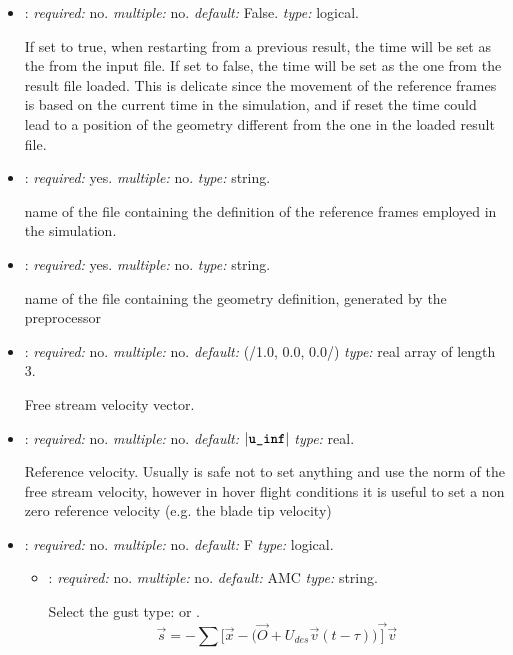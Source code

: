 \begin{itemize}
\item {}: \textit{required:} no. \textit{multiple:} no. \textit{default:} 
False. \textit{type:} logical.

If set to true, when restarting from a previous result, the time will be set as the 
 from the input file. If set to false, the time will be set as the one 
from the result file loaded. This is delicate since the movement of the reference 
frames is based on the current time in the simulation, and if reset the time could 
lead to a position of the geometry different from the one in the loaded result file.


\item {}: \textit{required:} yes. \textit{multiple:} no. 
\textit{type:} string.

name of the file containing the definition of the reference frames employed 
in the simulation.


\item {}: \textit{required:} yes. \textit{multiple:} no. 
\textit{type:} string.

name of the file containing the geometry definition, generated by the preprocessor


\item {}: \textit{required:} no. \textit{multiple:} no. 
\textit{default:} (/1.0, 0.0, 0.0/) \textit{type:} real array of length 3.

Free stream velocity vector.

\item {}: \textit{required:} no. \textit{multiple:} no. 
\textit{default:} $|\text{\textbf{\texttt{u\_inf}}}|$ \textit{type:} real.

Reference velocity. Usually is safe not to set anything and use the norm 
of the free stream velocity, however in hover flight conditions it is useful 
to set a non zero reference velocity (e.g. the blade tip velocity)


\item {}: \textit{required:} no. \textit{multiple:} no. 
\textit{default:} F \textit{type:} logical.

\begin{itemize}
    
    \item {}: \textit{required:} no. \textit{multiple:} no. \textit{default:} AMC \textit{type:} string.
    
    Select the gust type:  or .
    \begin{equation}
        \vec{s} = -\sum \big[\vec{x} - \big(\vec{O} + U_{des}\vec{v}(t-\tau)\big)\vec]\vec{v}
    \end{equation}
        

\end{itemize}
\end{itemize}
